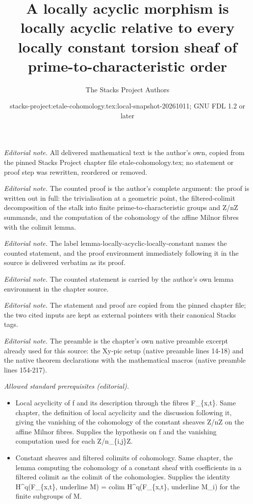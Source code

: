 \documentclass[10pt,a4paper]{amsart}
\title{A locally acyclic morphism is locally acyclic relative to every locally constant torsion sheaf of prime-to-characteristic order}
\author{The Stacks Project Authors}
\date{stacks-project:etale-cohomology.tex:local-snapshot-20261011; GNU FDL 1.2 or later}
\theoremstyle{plain}
\theoremstyle{definition}
\theoremstyle{remark}
\numberwithin{equation}{subsection}
\begin{document}
\maketitle
\noindent\textit{Editorial note.} All delivered mathematical text is the author's own, copied from the pinned Stacks Project chapter file etale-cohomology.tex; no statement or proof step was rewritten, reordered or removed.\par\medskip
\noindent\textit{Editorial note.} The counted proof is the author's complete argument: the proof is written out in full: the trivialisation at a geometric point, the filtered-colimit decomposition of the stalk into finite prime-to-characteristic groups and Z/nZ summands, and the computation of the cohomology of the affine Milnor fibres with the colimit lemma.\par\medskip
\noindent\textit{Editorial note.} The label lemma-locally-acyclic-locally-constant names the counted statement, and the proof environment immediately following it in the source is delivered verbatim as its proof.\par\medskip
\noindent\textit{Editorial note.} The counted statement is carried by the author's own lemma environment in the chapter source.\par\medskip
\noindent\textit{Editorial note.} The statement and proof are copied from the pinned chapter file; the two cited inputs are kept as external pointers with their canonical Stacks tags.\par\medskip
\noindent\textit{Editorial note.} The preamble is the chapter's own native preamble excerpt already used for this source: the Xy-pic setup (native preamble lines 14-18) and the native theorem declarations with the mathematical macros (native preamble lines 154-217).\par\medskip
\noindent\textit{Allowed standard prerequisites (editorial).}\begin{itemize}
\item Local acyclicity of f and its description through the fibres F\_\{x,t\}. Same chapter, the definition of local acyclicity and the discussion following it, giving the vanishing of the cohomology of the constant sheaves Z/nZ on the affine Milnor fibres. Supplies the hypothesis on f and the vanishing computation used for each Z/n\_\{i,j\}Z.
\item Constant sheaves and filtered colimits of cohomology. Same chapter, the lemma computing the cohomology of a constant sheaf with coefficients in a filtered colimit as the colimit of the cohomologies. Supplies the identity H\textasciicircum{}q(F\_\{x,t\}, underline M) = colim H\textasciicircum{}q(F\_\{x,t\}, underline M\_i) for the finite subgroups of M.
\end{itemize}\medskip
\end{document}

